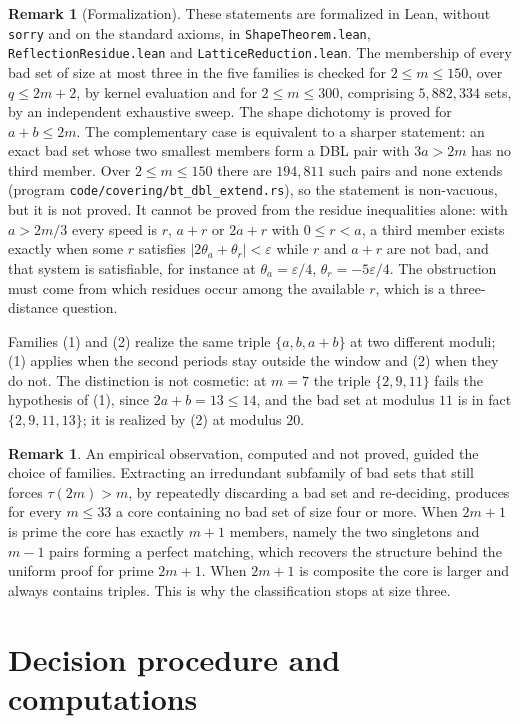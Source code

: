 \documentclass[11pt]{amsart}
\theoremstyle{plain}
\theoremstyle{definition}
\newtheorem{remark}[theorem]{Remark}
\begin{document}
\begin{remark}[Formalization]
These statements are formalized in Lean, without \texttt{sorry} and on the standard axioms, in
\texttt{ShapeTheorem.lean}, \texttt{ReflectionResidue.lean} and \texttt{LatticeReduction.lean}. The membership of every bad set of
size at most three in the five families is checked for $2\le m\le 150$, over $q\le 2m+2$, by kernel evaluation and for
$2\le m\le 300$, comprising $5{,}882{,}334$ sets, by an independent exhaustive sweep. The shape
dichotomy is proved for $a+b\le 2m$. The complementary case is equivalent to a sharper statement: an
exact bad set whose two smallest members form a DBL pair with $3a>2m$ has no third member. Over
$2\le m\le 150$ there are $194{,}811$ such pairs and none extends (program \texttt{code/covering/bt\_dbl\_extend.rs}), so the statement is non-vacuous,
but it is not proved. It cannot be proved from the residue inequalities alone: with $a>2m/3$ every
speed is $r$, $a+r$ or $2a+r$ with $0\le r<a$, a third member exists exactly when some $r$ satisfies
$|2\theta_a+\theta_r|<\varepsilon$ while $r$ and $a+r$ are not bad, and that system is satisfiable,
for instance at $\theta_a=\varepsilon/4$, $\theta_r=-5\varepsilon/4$. The obstruction must come from
which residues occur among the available $r$, which is a three-distance question.
\end{remark}

Families (1) and (2) realize the same triple $\{a,b,a+b\}$ at two different moduli; (1) applies when
the second periods stay outside the window and (2) when they do not. The distinction is not
cosmetic: at $m = 7$ the triple $\{2,9,11\}$ fails the hypothesis of (1), since $2a+b = 13 \le 14$,
and the bad set at modulus $11$ is in fact $\{2,9,11,13\}$; it is realized by (2) at modulus $20$.

\begin{remark}
An empirical observation, computed and not proved, guided the choice of families. Extracting an
irredundant subfamily of bad sets that still forces $\tau(2m) > m$, by repeatedly discarding a bad
set and re-deciding, produces for every $m \le 33$ a core containing no bad set of size four or
more. When $2m+1$ is prime the core has exactly $m+1$ members, namely the two singletons and $m-1$
pairs forming a perfect matching, which recovers the structure behind the uniform proof for prime
$2m+1$. When $2m+1$ is composite the core is larger and always contains triples. This is why the
classification stops at size three.
\end{remark}

\section{Decision procedure and computations}\label{sec:computation}
\end{document}
